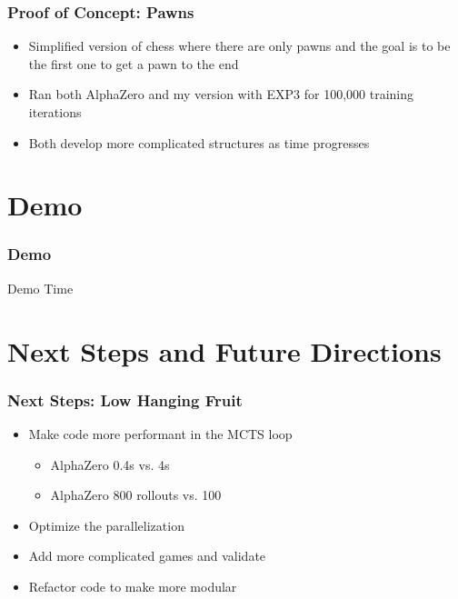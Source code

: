 \documentclass{beamer}
\begin{document}


\begin{frame}
  \frametitle{Proof of Concept: Pawns}

  \begin{itemize}
    \item Simplified version of chess where there are only pawns and the goal is to be the first one to get a pawn to the end
    \item Ran both AlphaZero and my version with EXP3 for 100,000 training iterations
    \item Both develop more complicated structures as time progresses
  \end{itemize}
\end{frame}


\section{Demo}


\begin{frame}
\frametitle{Demo}
  \begin{center}
    \Large Demo Time
    \end{center}
\end{frame}


\section{Next Steps and Future Directions}


\begin{frame}
  \frametitle{Next Steps: Low Hanging Fruit}

  \begin{itemize}
    \item Make code more performant in the MCTS loop
      \begin{itemize}
        \item AlphaZero 0.4s vs. 4s
        \item AlphaZero 800 rollouts vs. 100
      \end{itemize}
    \item Optimize the parallelization
    \item Add more complicated games and validate
    \item Refactor code to make more modular
  \end{itemize}
\end{frame}
\end{document}

